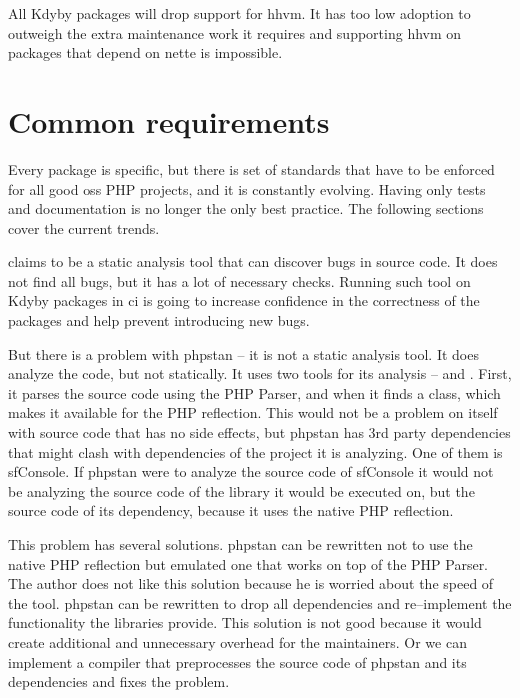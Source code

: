 All Kdyby packages will drop support for \gls{hhvm}. It has too low adoption to outweigh the extra maintenance work it requires and supporting \gls{hhvm} on packages that depend on \gls{nette} is impossible.

\section{Common requirements} \label{sec:roadmap:common}

Every package is specific, but there is set of standards that have to be enforced for all good \gls{oss} PHP projects, and it is constantly evolving. Having only tests and documentation is no longer the only best practice. The following sections cover the current trends.


 claims to be a static analysis tool that can discover bugs in source code. It does not find all bugs, but it has a lot of necessary checks. Running such tool on Kdyby packages in \gls{ci} is going to increase confidence in the correctness of the packages and help prevent introducing new bugs.

But there is a problem with \gls{phpstan} -- it is not a static analysis tool. It does analyze the code, but not statically. It uses two tools for its analysis --  and . First, it parses the source code using the PHP Parser, and when it finds a class,  which makes it available for the PHP reflection. This would not be a problem on itself with source code that has no side effects, but \gls{phpstan} has 3rd party dependencies that might clash with dependencies of the project it is analyzing. One of them is \gls{sfConsole}. If \gls{phpstan} were to analyze the source code of \gls{sfConsole} it would not be analyzing the source code of the library it would be executed on, but the source code of its dependency, because it uses the native PHP reflection.

This problem has several solutions. \gls{phpstan} can be rewritten not to use the native PHP reflection but emulated one that works on top of the PHP Parser. The author does not like this solution because he is worried about the speed of the tool. \gls{phpstan} can be rewritten to drop all dependencies and re--implement the functionality the libraries provide. This solution is not good because it would create additional and unnecessary overhead for the maintainers. Or we can implement a compiler that preprocesses the source code of \gls{phpstan} and its dependencies and fixes the problem.

